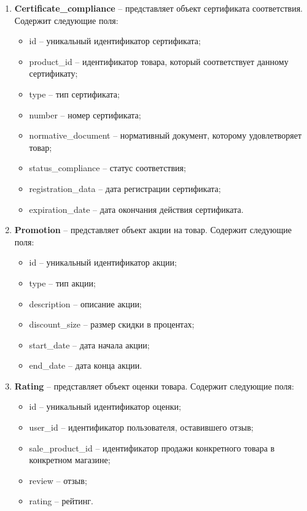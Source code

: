 \begin{enumerate}
	\item \textbf{Certificate\_compliance} -- представляет объект сертификата соответствия. Содержит следующие поля: 
	\begin{itemize}
		\item id -- уникальный идентификатор сертификата;
		\item product\_id -- идентификатор товара, который соответствует данному сертификату;
		\item type -- тип сертификата;
		\item number -- номер сертификата;
		\item normative\_document -- нормативный документ, которому удовлетворяет товар;
		\item status\_compliance -- статус соответствия;
		\item registration\_data -- дата регистрации сертификата;
		\item expiration\_date -- дата окончания действия сертификата.
	\end{itemize}
	
	\item \textbf{Promotion} -- представляет объект акции на товар. Содержит следующие поля: 
	\begin{itemize}
		\item id -- уникальный идентификатор акции;
		\item type -- тип акции;
		\item description -- описание акции;
		\item discount\_size -- размер скидки в процентах;
		\item start\_date -- дата начала акции;
		\item end\_date -- дата конца акции.
	\end{itemize}
	
\clearpage 

	\item \textbf{Rating} -- представляет объект оценки товара. Содержит следующие поля: 
	\begin{itemize}
		\item id -- уникальный идентификатор оценки;
		\item user\_id -- идентификатор пользователя, оставившего отзыв;
		\item  sale\_product\_id -- идентификатор продажи конкретного товара в конкретном магазине;
		\item review -- отзыв;
		\item rating -- рейтинг.
	\end{itemize}
	

\end{enumerate}
